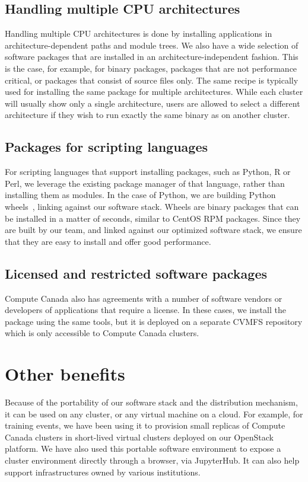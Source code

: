 \documentclass[sigconf]{acmart}
\begin{document}
\subsection{Handling multiple CPU architectures}
\label{sub:Handling_multiple_CPU_architectures}
Handling multiple CPU architectures is done by installing applications in architecture-dependent paths and module trees. We also have a wide selection of software packages that are installed in an architecture-independent fashion. This is the case, for example, for binary packages, packages that are not performance critical, or packages that consist of source files only. The same recipe is typically used for installing the same package for multiple architectures. While each cluster will usually show only a single architecture, users are allowed to select a different architecture if they wish to run exactly the same binary as on another cluster.

\subsection{Packages for scripting languages}
\label{sub:Packages_for_scripting_languages}
For scripting languages that support installing packages, such as Python, R or Perl, we leverage the existing package manager of that language, rather than installing them as modules. In the case of Python, we are building Python wheels~\cite{Wheels}, linking against our software stack. Wheels are binary packages that can be installed in a matter of seconds, similar to CentOS RPM packages. Since they are built by our team, and linked against our optimized software stack, we ensure that they are easy to install and offer good performance.

\subsection{Licensed and restricted software packages}
\label{sub:Licensed_software_packages}
Compute Canada also has agreements with a number of software vendors or developers of applications that require a license. In these cases, we install the package using the same tools, but it is deployed on a separate CVMFS repository which is only accessible to Compute Canada clusters.

\section{Other benefits}
\label{sec:Other_benefits}
Because of the portability of our software stack and the distribution mechanism, it can be used on any cluster, or any virtual machine on a cloud. For example, for training events, we have been using it to provision small replicas of Compute Canada clusters in short-lived virtual clusters deployed on our OpenStack platform. We have also used this portable software environment to expose a cluster environment directly through a browser, via JupyterHub. It can also help support infrastructures owned by various institutions.
\end{document}
